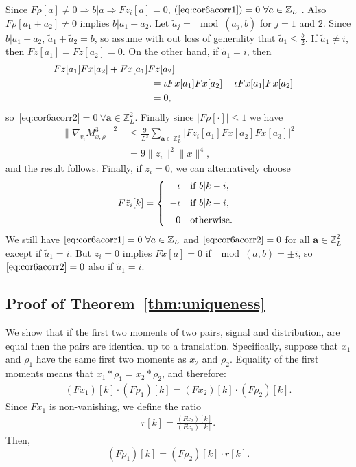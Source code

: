 \documentclass{IEEEtran}
\numberwithin{equation}{section}
\numberwithin{figure}{section}
\theoremstyle{plain}
\theoremstyle{definition}
\theoremstyle{remark}
\theoremstyle{plain}
\theoremstyle{remark}
\theoremstyle{plain}
\theoremstyle{plain}
\theoremstyle{remark}
\newcommand{\F}{F}
\newcommand{\Z}{{\mathbb{Z}}}
\def\aa{\mathbf{a}}
\begin{document}
Since $\F\rho[a]\neq 0\Rightarrow b|a \Rightarrow \F z_i[a]=0$, $(\ref{eq:cor6acorr1})=0 ~\forall a\in\Z_L$ . Also $\F\rho[a_1+a_2]\neq 0$ implies $b|a_1+a_2$. Let $\tilde a_j=\mod(a_j,b)$ for $j=1$ and $2$. Since $b|a_1+a_2$, $\tilde a_1+\tilde a_2=b$, so assume with out loss of generality that $\tilde a_1\le \frac b2$. If $\tilde a_1\neq i$, then $\F z[a_1]=\F z[a_2]=0$. On the other hand, if $\tilde a_1= i$, then
\begin{align*}
\F z[a_1]\F x[a_2]+\F x[a_1]\F z[a_2]\hspace{-25pt}\\
&=\iota\F x[a_1]\F x[a_2]-\iota\F x[a_1]\F x[a_2]\\
&=0,
\end{align*}
so~\eqref{eq:cor6acorr2}$=0~\forall \aa\in\Z^2_L$. Finally since $|\F\rho[\cdot]|\le 1$ we have
\begin{align*}
\|\nabla_{v_i} M^3_{x,\rho} \|^2&\le \frac9{L^3}\sum_{\aa\in\Z_L^3}|\F z_i[a_1]\F x[a_2]\F x[a_3]|^2\\
&=9\|z_i\|^2\|x\|^4,
\end{align*}
and the result follows. Finally, if $z_i=0$, we can alternatively choose 
$$\F \tilde z_i[k]=\left\{\begin{array}{rl}
\medskip  \iota&\text{if }b|k-i,\\
\medskip -\iota&\text{if }b|k+i,\\
0&\text{otherwise.}\end{array}\right.$$ 
We still have $\eqref{eq:cor6acorr1}=0 ~\forall a\in\Z_L$ and $\eqref{eq:cor6acorr2}=0 $ for all $\aa\in\Z^2_L$ except if $\tilde a_1=i$. But $z_i=0$ implies $\F x[a]=0$ if $\mod(a,b)=\pm i$, so $\eqref{eq:cor6acorr2}=0 $ also if $\tilde a_1=i$.

\subsection{Proof of Theorem~\ref{thm:uniqueness}} \label{sec:proof_thm_uniqueness}

We show that if the first two moments of two pairs, signal and distribution, are equal then the pairs are identical up to a translation. Specifically, suppose that $x_1$ and $\rho_1$ have the same first two moments as $x_2$ and $\rho_2$. Equality of the first moments means that $x_1 \ast \rho_1=  x_2 \ast \rho_2$, and therefore:
%
\begin{align*}
%
    (\F x_1)[k] \cdot (\F\rho_1)[k] = (\F x_2)[k] \cdot (\F \rho_2)[k].
%
\end{align*}
%
Since $\F x_1$ is non-vanishing, we define the ratio 
%
\begin{align*}
%
    r[k] = \frac{(F x_2) [k]}{(F x_1) [k]}.
%
\end{align*}
Then,
%
\begin{equation} \label{eqn:first_moment_relation}
%
    (\F \rho_1) [k] = (\F \rho_2) [k] \cdot r[k].
%
\end{equation}
%
\end{document}
